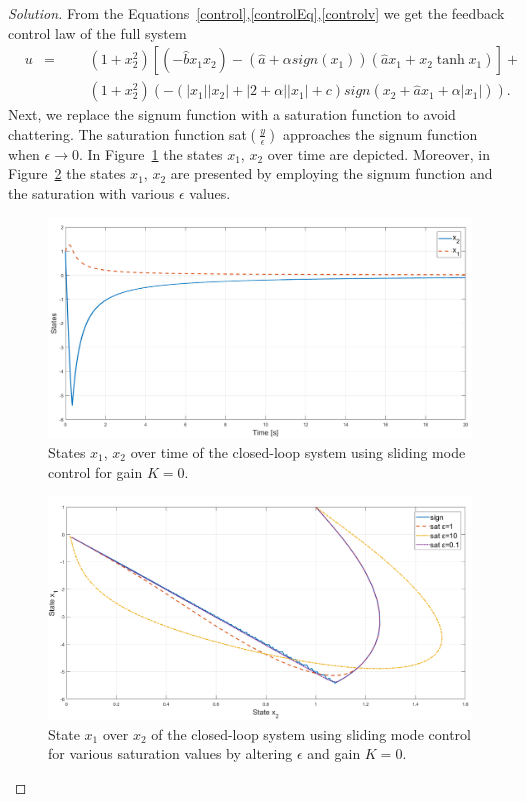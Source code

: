 \documentclass[12pt]{article}
\newenvironment{solution}{\begin{proof}[Solution]}{\end{proof}}
\begin{document}
\begin{solution}
From the Equations~\ref{control},\ref{controlEq},\ref{controlv} we get the feedback control law of the full system
\begin{align*}
&u 
&= 
&&&(1+x_2^2)[(-\hat{b}x_1x_2)-(\hat{a}+\alpha sign(x_1))(\hat{a}x_1+x_2 \tanh x_1)]+\\
&&
&&& (1+x_2^2)(- (|x_1 | |x_2|+ |2+\alpha||x_1| +c) sign(x_2+\hat{a}x_1+\alpha |x_1|)).
\end{align*}
Next, we replace the signum function with a saturation function to avoid chattering. The saturation function sat$(\frac{y}{\epsilon })$ approaches the signum function when $\epsilon \rightarrow 0$. In Figure~\ref{fig:x_1-x_2-t} the states $x_1$, $x_2$ over time are depicted. Moreover, in Figure~\ref{fig:x_1-x_2-smc} the states $x_1$, $x_2$ are presented by employing the signum function and the saturation with various $\epsilon $ values.
\begin{figure}[!h]
	\includegraphics[scale=0.35]{figures/x1_x2_t_p4b.png}
	\centering
	\caption{States $x_1$, $x_2$ over time of the closed-loop system using sliding mode control for gain $K=0$.}
	\label{fig:x_1-x_2-t}
\end{figure}
\begin{figure}[!t]
	\includegraphics[scale=0.35]{figures/x1_x2_p4b.png}
	\centering
	\caption{State $x_1$ over $x_2$ of the closed-loop system using sliding mode control for various saturation values by altering $\epsilon$ and gain $K=0$.}
	\label{fig:x_1-x_2-smc}
\end{figure}
\end{solution}
\end{document}
